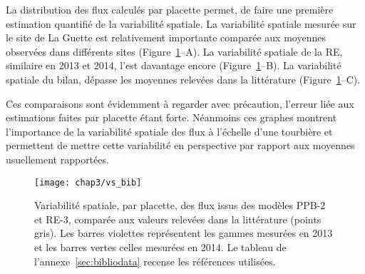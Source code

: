 La distribution des flux calculés par placette permet, de faire une première estimation quantifié de la variabilité spatiale.
La variabilité spatiale mesurée sur le site de La Guette est relativement importante comparée aux moyennes observées dans différents sites (Figure~\ref{fig:vs_bib}--A).
La variabilité spatiale de la RE, similaire en 2013 et 2014, l'est davantage encore (Figure~\ref{fig:vs_bib}--B).
La variabilité spatiale du bilan, dépasse les moyennes relevées dans la littérature (Figure~\ref{fig:vs_bib}--C).

Ces comparaisons sont évidemment à regarder avec précaution, l'erreur liée aux estimations faites par placette étant forte.
Néanmoins ces graphes montrent l'importance de la variabilité spatiale des flux à l'échelle d'une tourbière et permettent de mettre cette variabilité en perspective par rapport aux moyennes usuellement rapportées.


\begin{figure}[!htb]
\centering
\texttt{[image: chap3/vs\_bib]}
\caption{Variabilité spatiale, par placette, des flux issus des modèles PPB-2 et RE-3, comparée aux valeurs relevées dans la littérature (points gris). Les barres violettes représentent les gammes mesurées en 2013 et les barres vertes celles mesurées en 2014. Le tableau de l'annexe~\ref{sec:bibliodata} recense les références utilisées.}
\label{fig:vs_bib}
\end{figure}
%


